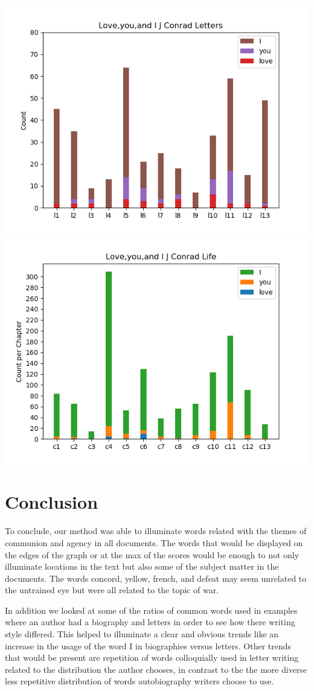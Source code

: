 \documentclass{article}
\begin{document}
    \begin{center}
       \includegraphics[width=0.8\linewidth]{j_conrad_letters.png}
        \includegraphics[width=0.8\linewidth]{j_conrad_life.png}
    \end{center}

\section*{Conclusion}
To conclude, our method was able to illuminate words related with the themes of communion and agency in all documents. The words that would be displayed on the edges of the graph or at the max of the scores would be enough to not only illuminate locations in the text but also some of the subject matter in the documents. The words concord, yellow, french, and defeat may seem unrelated to the untrained eye but were all related to the topic of war. 

In addition we looked at some of the ratios of common words used in examples where an author had a biography and letters in order to see how there writing style differed. This helped to illuminate a clear and obvious trends like an increase in the usage of the word I in biographies versus letters. Other trends that would be present are repetition of words colloquially used in letter writing related to the distribution the author chooses, in contrast to the the more diverse less repetitive distribution of words autobiography writers choose to use. 
\end{document}
